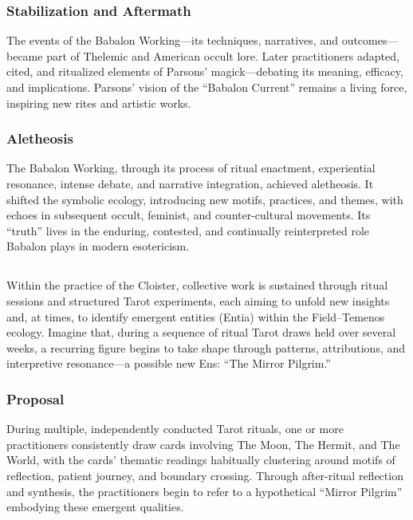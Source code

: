 \subsubsection*{Stabilization and Aftermath}

The events of the Babalon Working—its techniques, narratives, and
outcomes—became part of Thelemic and American occult lore. Later practitioners
adapted, cited, and ritualized elements of Parsons’ magick—debating its
meaning, efficacy, and implications. Parsons’ vision of the “Babalon Current”
remains a living force, inspiring new rites and artistic works.

\subsubsection*{Aletheosis}

The Babalon Working, through its process of ritual enactment, experiential
resonance, intense debate, and narrative integration, achieved aletheosis. It
shifted the symbolic ecology, introducing new motifs, practices, and themes,
with echoes in subsequent occult, feminist, and counter-cultural movements. Its
“truth” lives in the enduring, contested, and continually reinterpreted role
Babalon plays in modern esotericism.


\subsection*{}

Within the practice of the Cloister, collective work is sustained through
ritual sessions and structured Tarot experiments, each aiming to unfold new
insights and, at times, to identify emergent entities (Entia) within the
Field–Temenos ecology. Imagine that, during a sequence of ritual Tarot draws
held over several weeks, a recurring figure begins to take shape through
patterns, attributions, and interpretive resonance—a possible new Ens: “The
Mirror Pilgrim.”

\subsubsection{Proposal}

During multiple, independently conducted Tarot rituals, one or more
practitioners consistently draw cards involving The Moon, The Hermit, and The
World, with the cards’ thematic readings habitually clustering around motifs of
reflection, patient journey, and boundary crossing. Through after-ritual
reflection and synthesis, the practitioners begin to refer to a hypothetical
“Mirror Pilgrim” embodying these emergent qualities.

